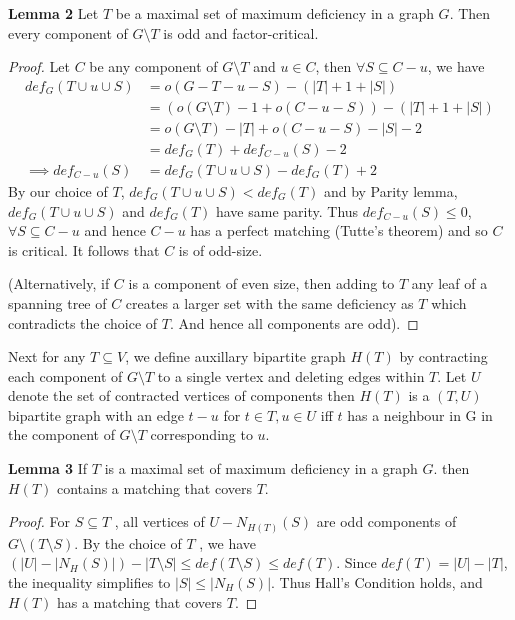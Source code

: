 \documentclass[12pt]{article}
\newcommand*{\union}{\cup}
\begin{document}
\textbf{Lemma 2} Let $T$ be a maximal set of maximum deficiency in a graph $G$. Then every component of $G \setminus T$ is odd and factor-critical.
\begin{proof}
Let $C$ be any component of $G \setminus T$ and $u \in C$, then $\forall S \subseteq C-u$, we have
\begin{align*}
    def_G(T \union u \union S) &= o(G-T-u-S) - (|T|+1+|S|) \\
    &= (o(G \setminus T) - 1 + o(C-u-S)) - (|T|+1+|S|) \\
    &= o(G \setminus T) - |T| + o(C-u-S) - |S| - 2 \\
    &= def_G(T) + def_{C-u}(S) - 2 \\
    \implies def_{C-u}(S) &= def_G(T \union u \union S) - def_G(T) + 2
\end{align*}
By our choice of $T$, $def_G(T \union u \union S) < def_G(T)$ and by Parity lemma, $def_G(T \union u \union S)$ and $def_G(T)$ have same parity. Thus $def_{C-u}(S) \leq 0$, $\forall S \subseteq C-u$ and hence $C-u$ has a perfect matching (Tutte's theorem) and so $C$ is critical. It follows that $C$ is of odd-size.

(Alternatively, if $C$ is a component of even size, then adding to $T$ any leaf of a spanning tree of $C$ creates a larger set with the same deficiency as $T$ which contradicts the choice of $T$. And hence all components are odd).
\end{proof}

Next for any $T \subseteq V$, we define auxillary bipartite graph $H(T)$ by contracting each component of $G \setminus T$ to a single vertex and deleting edges within $T$. Let $U$ denote the set of contracted vertices of components then $H(T)$ is a $(T,U)$ bipartite graph with an edge $t-u$ for $t \in T, u \in U$ iff $t$ has a neighbour in G in the component of $G \setminus T$ corresponding to $u$.
\newline

\textbf{Lemma 3} If $T$ is a maximal set of maximum deficiency in a graph $G$. then $H(T)$ contains a matching that covers $T$.

\begin{proof}
For $S \subseteq T$ , all vertices of $U - N_{H(T)}(S)$ are odd components of $G \setminus (T \setminus S)$. By the choice of $T$ , we have $(|U|-|N_{H}(S)|) - |T \setminus S| \leq def(T \setminus S) \leq def(T)$. Since $def(T) = |U| - |T|$,
the inequality simplifies to $|S| \leq |N_H(S)|$. Thus Hall’s Condition holds, and $H(T)$ has a matching that covers $T$.
\end{proof}
\end{document}
